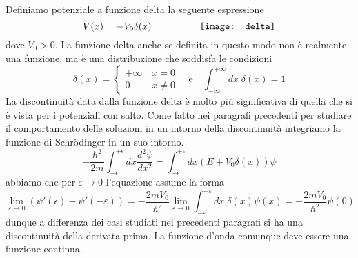 Definiamo potenziale a funzione delta la seguente espressione
\begin{equation*}
	V(x) = -V_0\delta(x)
	\quad\quad\quad\quad\quad 
 	\vcenter{\hbox{\texttt{[image: delta]}}}
\end{equation*}
dove $V_0 > 0 $. La funzione delta anche se definita in questo modo non \`e realmente una funzione, ma \`e una distribuzione che soddisfa le condizioni
\begin{equation*}
	\delta(x) = 
	\begin{cases}
		+ \infty \quad x  =  0\\
		0 \quad\quad\;  x \neq 0
	\end{cases}
	\quad \text{e} \quad \int_{-\infty}^{+\infty}dx\;\delta(x) =1
\end{equation*}
La discontinuit\`a data dalla funzione delta \`e molto pi\`u significativa di quella che si \`e vista per i potenziali con salto. Come fatto nei paragrafi precedenti per studiare il comportamento delle soluzioni in un intorno della discontinuit\`a integriamo la funzione di Schr\"odinger in un suo intorno.
\begin{equation*}
-\frac{\hbar^2}{2 m} \int_{-\epsilon}^{+\epsilon} d x \frac{d^2 \psi}{d x^2}=\int_{-\epsilon}^{+\epsilon} d x\left(E+V_0 \delta(x)\right) \psi
\end{equation*}
abbiamo che per $\varepsilon \to 0 $ l'equazione assume la forma 
\begin{equation}
	\lim_{\varepsilon \to 0} \left (\psi'(\epsilon) - \psi'(-\varepsilon) \right) = - \frac{2mV_0}{\hbar^2} \lim_{\varepsilon \to 0}\int_{-\varepsilon}^{+\varepsilon}dx \; \delta(x)\psi(x) = -\frac{2mV_0}{\hbar^2} \psi(0)
\end{equation}
dunque a differenza dei casi studiati nei precedenti paragrafi si ha una discontinuit\`a della derivata prima. La funzione d'onda comunque deve essere una funzione continua.
\newline

